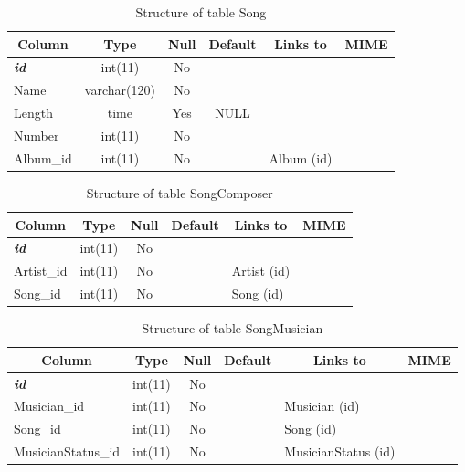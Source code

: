 \documentclass[10pt,a4paper,oneside,notitlepage]{article}
\begin{document}
%
%
 \begin{longtable}{|l|c|c|c|l|l|} 
 \caption{Structure of table Song} \label{tab:Song-structure} \\
 \hline \multicolumn{1}{|c|}{\textbf{Column}} & \multicolumn{1}{|c|}{\textbf{Type}} & \multicolumn{1}{|c|}{\textbf{Null}} & \multicolumn{1}{|c|}{\textbf{Default}} & \multicolumn{1}{|c|}{\textbf{Links to}} & \multicolumn{1}{|c|}{\textbf{MIME}} \\ \hline \hline
\textbf{\textit{id}} & int(11) & No &  &  &  \\ \hline 
Name & varchar(120) & No &  &  &  \\ \hline 
Length & time & Yes & NULL &  &  \\ \hline 
Number & int(11) & No &  &  &  \\ \hline 
Album\_id & int(11) & No &  & Album (id) &  \\ \hline 
 \end{longtable}

%
%
 \begin{longtable}{|l|c|c|c|l|l|} 
 \caption{Structure of table SongComposer} \label{tab:SongComposer-structure} \\
 \hline \multicolumn{1}{|c|}{\textbf{Column}} & \multicolumn{1}{|c|}{\textbf{Type}} & \multicolumn{1}{|c|}{\textbf{Null}} & \multicolumn{1}{|c|}{\textbf{Default}} & \multicolumn{1}{|c|}{\textbf{Links to}} & \multicolumn{1}{|c|}{\textbf{MIME}} \\ \hline \hline
\textbf{\textit{id}} & int(11) & No &  &  &  \\ \hline 
Artist\_id & int(11) & No &  & Artist (id) &  \\ \hline 
Song\_id & int(11) & No &  & Song (id) &  \\ \hline 
 \end{longtable}

\pagebreak 

%
%
 \begin{longtable}{|l|c|c|c|l|l|} 
 \caption{Structure of table SongMusician} \label{tab:SongMusician-structure} \\
 \hline \multicolumn{1}{|c|}{\textbf{Column}} & \multicolumn{1}{|c|}{\textbf{Type}} & \multicolumn{1}{|c|}{\textbf{Null}} & \multicolumn{1}{|c|}{\textbf{Default}} & \multicolumn{1}{|c|}{\textbf{Links to}} & \multicolumn{1}{|c|}{\textbf{MIME}} \\ \hline \hline
\textbf{\textit{id}} & int(11) & No &  &  &  \\ \hline 
Musician\_id & int(11) & No &  & Musician (id) &  \\ \hline 
Song\_id & int(11) & No &  & Song (id) &  \\ \hline 
MusicianStatus\_id & int(11) & No &  & MusicianStatus (id) &  \\ \hline 
 \end{longtable}
\end{document}
